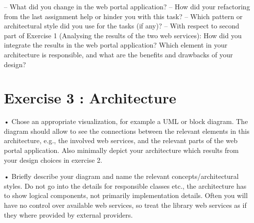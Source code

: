     – What did you change in the web portal application?
    – How did your refactoring from the last assignment help or hinder you with
    this task?
    – Which pattern or architectural style did you use for the tasks (if any)?
    – With respect to second part of Exercise 1 (Analysing the results of the two
    web services): How did you integrate the results in the web portal application?
    Which element in your architecture is responsible, and what are the benefits
    and drawbacks of your design?

\section{Exercise 3 : Architecture}

    • Chose an appropriate visualization, for example a UML or block diagram. The
    diagram should allow to see the connections between the relevant elements in this
    architecture, e.g., the involved web services, and the relevant parts of the web
    portal application. Also minimally depict your architecture which results from
    your design choices in exercise 2.

    • Briefly describe your diagram and name the relevant concepts/architectural styles.
    Do not go into the details for responsible classes etc., the architecture has to show
    logical components, not primarily implementation details. Often you will have no
    control over available web services, so treat the library web services as if they where
    provided by external providers.
